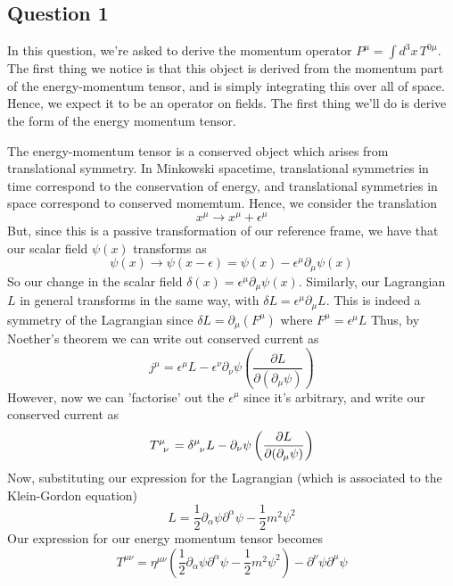 \subsection{Question 1} 

In this question, we're asked to derive the momentum operator $P^\mu = \int d^3x \, T^{ 0 \mu} $. The first thing we notice is that this object is derived from the momentum part of the energy-momentum tensor, and is simply integrating this over all of space. Hence, we expect it to be an operator on fields. The first thing we'll do is derive the form of the energy momentum tensor. 

The energy-momentum tensor is a conserved object which arises from translational symmetry. In Minkowski spacetime, translational symmetries in time correspond to the conservation of energy, and translational symmetries in space correspond to conserved momemtum. Hence, we consider the translation \[ x^\mu \rightarrow x^\mu + \epsilon^\mu \] 
But, since this is a passive transformation of our reference frame, we have that our scalar field $\psi(x)$  transforms as \[ \psi(x) \rightarrow \psi(x - \epsilon) = \psi(x)  - \epsilon^\mu \partial_\mu \psi( x) \] 
So our change in the scalar field $\delta( x) = \epsilon^\mu\partial_\mu \psi(x) $. Similarly, our Lagrangian $L$ in general transforms in the same way, with $\delta L = \epsilon^\mu \partial_\mu L $. This is indeed a symmetry of the Lagrangian since $\delta L = \partial_\mu ( F^\mu ) $ where $F^\mu = \epsilon^\mu L $ Thus, by Noether's theorem we can write out conserved current as 
\[ j^\mu = \epsilon^\mu L - \epsilon^\nu \partial_\nu \psi \left( \frac{ \partial L }{\partial ( \partial_\mu \psi) } \right) \]    
However, now we can 'factorise' out the $\epsilon^\mu$ since it's arbitrary, and write our conserved current as \[ T\indices{^\mu_\nu}  = \delta\indices{^\mu_\nu} L  - \partial_\nu \psi \left( \frac{ \partial L }{ \partial ( \partial_\mu \psi) } \right) \] 
Now, substituting our expression for the Lagrangian (which is associated to the Klein-Gordon equation) 
\[ L = \frac{1}{2} \partial_\alpha \psi \partial^\alpha \psi  - \frac{1}{2} m^2 \psi^2 \] 
Our expression for our energy momentum tensor becomes 
\[ T^{ \mu \nu} = \eta^{ \mu \nu} \left( \frac{ 1}{2} \partial_\alpha \psi \partial^\alpha \psi  - \frac{1}{2} m^2 \psi^2 \right)  - \partial^\nu \psi \partial^\mu \psi \] 


